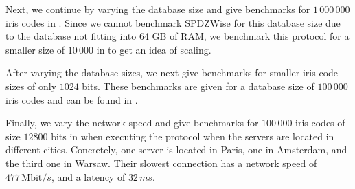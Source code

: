 \documentclass[a4paper,11pt,
]{article}
\begin{document}
Next, we continue by varying the database size and give benchmarks for $1\,000\,000$ iris codes in . Since we cannot benchmark SPDZWise for this database size due to the database not fitting into 64 GB of RAM, we benchmark this protocol for a smaller size of $10\,000$ in  to get an idea of scaling.

After varying the database sizes, we next give benchmarks for smaller iris code sizes of only $1024$ bits. These benchmarks are given for a database size of $100\,000$ iris codes and can be found in .

Finally, we vary the network speed and give benchmarks for $100\,000$ iris codes of size $12800$ bits in  when executing the protocol when the servers are located in different cities. Concretely, one server is located in Paris, one in Amsterdam, and the third one in Warsaw. Their slowest connection has a network speed of $477\,\text{Mbit}/s$, and a latency of $32\,ms$.
\end{document}
